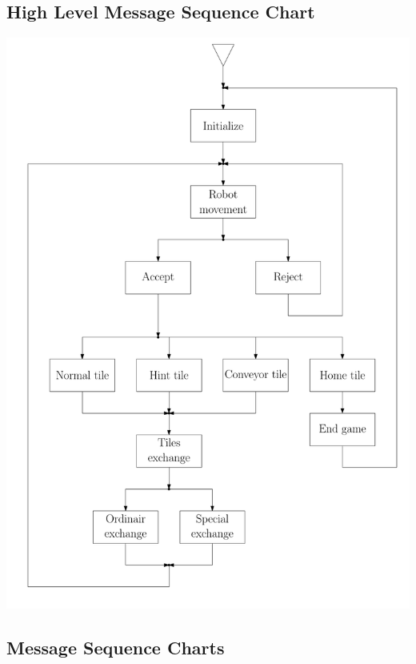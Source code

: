 \subsection{High Level Message Sequence Chart}
	\includegraphics[width=\linewidth,bb=0 0 680 1000]{MSC-files/HMSC.pdf}
	
\subsection{Message Sequence Charts}
